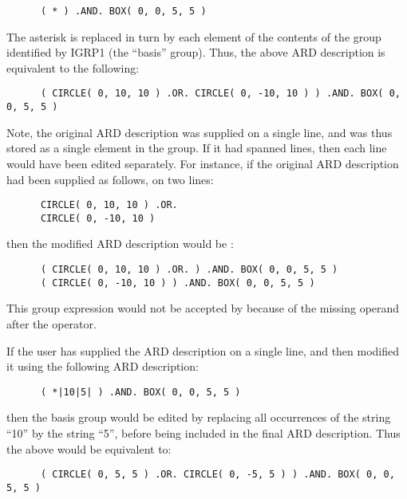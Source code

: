 \small
\begin{verbatim}
      ( * ) .AND. BOX( 0, 0, 5, 5 )
\end{verbatim}
\normalsize

The asterisk is replaced in turn by each element of the contents of the 
group identified by IGRP1 (the ``basis'' group). 
Thus, the above ARD description is equivalent to the following:

\small
\begin{verbatim}
      ( CIRCLE( 0, 10, 10 ) .OR. CIRCLE( 0, -10, 10 ) ) .AND. BOX( 0, 0, 5, 5 )
\end{verbatim}
\normalsize

Note, the original ARD description was supplied on a single line, and was
thus stored as a single element in the group. If it had spanned lines,
then each line would have been edited separately. For instance, if the
original ARD description had been supplied as follows, on two lines:

\small
\begin{verbatim}
      CIRCLE( 0, 10, 10 ) .OR. 
      CIRCLE( 0, -10, 10 )
\end{verbatim}
\normalsize

then the modified ARD description would be :

\small
\begin{verbatim}
      ( CIRCLE( 0, 10, 10 ) .OR. ) .AND. BOX( 0, 0, 5, 5 )
      ( CIRCLE( 0, -10, 10 ) ) .AND. BOX( 0, 0, 5, 5 )
\end{verbatim}
\normalsize

This group expression would not be accepted by 
because of the missing operand after the  operator.

If the user has supplied the ARD description on a single line, and then
modified it using the following ARD description:

\small
\begin{verbatim}
      ( *|10|5| ) .AND. BOX( 0, 0, 5, 5 )
\end{verbatim}
\normalsize

then the basis group would be edited by replacing all occurrences of the
string ``10'' by the string ``5'', before being included in the final ARD
description. Thus the above would be equivalent to:

\small
\begin{verbatim}
      ( CIRCLE( 0, 5, 5 ) .OR. CIRCLE( 0, -5, 5 ) ) .AND. BOX( 0, 0, 5, 5 )
\end{verbatim}
\normalsize

